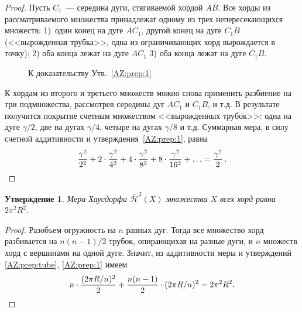 \documentclass[12pt]{article}
\newtheorem{prep}{Утверждение}
\begin{document}
\begin{proof}
  Пусть $C_1$~--- середина дуги, стягиваемой хордой $AB$. Все хорды из
  рассматриваемого множества принадлежат одному из трех непересекающихся
  множеств: 1)~один конец на дуге $AC_1$, другой конец на дуге $C_1B$
  (<<вырожденная трубка>>, одна из ограничивающих хорд вырождается в точку); 2) оба
  конца лежат на дуге $AC_1$ 3) оба конца лежат на дуге $C_1B$.

  \begin{figure}[h]
    \centering
    \caption{\label{AZ:fig:edge}%
      К доказательству Утв.~\ref{AZ:prep:1}
    }
  \end{figure}
  
  К хордам из
  второго и третьего множеств можно снова применить разбиение на три
  подмножества, рассмотрев середины дуг $AC_1$ и $C_1B$, и т.д. В результате
  получится покрытие счетным множеством <<вырожденных трубок>>: одна на дуге
  $\gamma/2$, две на дугах $\gamma/4$, четыре на дугах $\gamma/8$ и
  т.д. Суммарная мера, в силу счетной аддитивности и утверждения~\ref{AZ:prep:1}, равна
  $$
  \frac{\gamma^2}{2^2}+2\cdot \frac{\gamma^2}{4^2}+
  4\cdot \frac{\gamma^2}{8^2}+ 8\cdot \frac{\gamma^2}{16^2}+\ldots = \frac{\gamma^2}{2}\,.\qedhere
  $$
\end{proof}

\begin{prep}
  Мера Хаусдорфа $\bar{\mathcal H}^2(X)$ множества $X$ всех хорд равна
  $2\pi^2R^2$.
\end{prep}
\begin{proof}
  Разобъем огружность на  $n$ равных дуг. Тогда все множество хорд разбивается
  на $n(n-1)/2$ трубок, опирающихая на разные дуги, и $n$ множеств хорд с
  вершинами на одной дуге. Значит, из аддитивности меры и утверждений
  \ref{AZ:prep:tube}, \ref{AZ:prep:1} имеем
  $$
  n\cdot\frac{(2\pi R/n)^2}{2}+
  \frac{n(n-1)}{2}\cdot (2\pi R/n)^2=2\pi^2 R^2. \qedhere
  $$
\end{proof}
\end{document}
